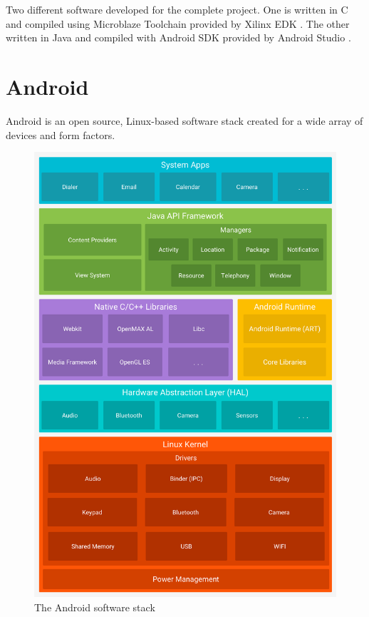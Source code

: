 Two different software developed for the complete project. One is written in C and compiled using Microblaze Toolchain provided by Xilinx EDK \cite{xilinx-xps-edk}. The other written in Java and compiled with Android SDK provided by Android Studio \cite{android-studio}. 

\section{Android}
Android is an open source, Linux-based software stack created for a wide array of devices and form factors.

\begin{figure}
	\centering
	\includegraphics[scale=0.1]{images/android-stack.png}
	\caption{The Android software stack}
\end{figure}

